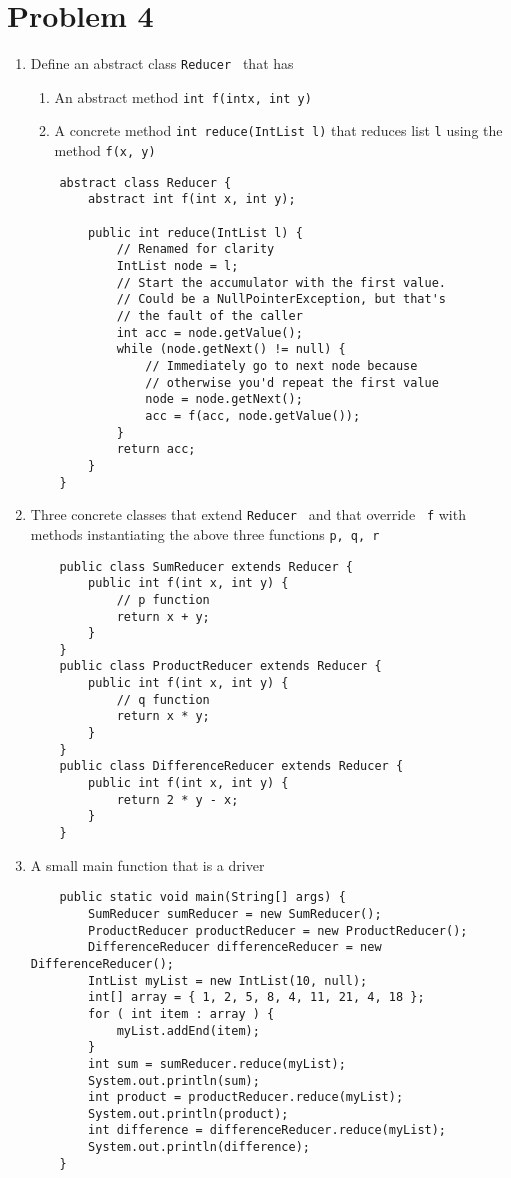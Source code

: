 \documentclass[12pt]{article}
\begin{document}
\section{Problem 4}
\begin{enumerate}
\item Define an abstract class {\tt Reducer } that has
  \begin{enumerate}[label=(\alph*)]
  \item An abstract method {\tt int f(intx, int y)}
  \item A concrete method {\tt int reduce(IntList l)} that reduces list {\tt l}
    using the method {\tt f(x, y) }
  \end{enumerate}
  \begin{verbatim}
    abstract class Reducer {
        abstract int f(int x, int y);
        
        public int reduce(IntList l) {
            // Renamed for clarity
            IntList node = l;
            // Start the accumulator with the first value.
            // Could be a NullPointerException, but that's
            // the fault of the caller
            int acc = node.getValue();
            while (node.getNext() != null) {
                // Immediately go to next node because
                // otherwise you'd repeat the first value
                node = node.getNext();
                acc = f(acc, node.getValue());
            }
            return acc;
        }
    }
  \end{verbatim}
\item Three concrete classes that extend {\tt Reducer } and that override {\tt
  f} with methods instantiating the above three functions {\tt p, q, r}
  \begin{verbatim}
    public class SumReducer extends Reducer {
        public int f(int x, int y) {
            // p function
            return x + y;
        }
    }
    public class ProductReducer extends Reducer {
        public int f(int x, int y) {
            // q function
            return x * y;
        }
    }
    public class DifferenceReducer extends Reducer {
        public int f(int x, int y) {
            return 2 * y - x;
        }
    }
  \end{verbatim}
\item A small main function that is a driver
  \begin{verbatim}
    public static void main(String[] args) {
        SumReducer sumReducer = new SumReducer();
        ProductReducer productReducer = new ProductReducer();
        DifferenceReducer differenceReducer = new DifferenceReducer();
        IntList myList = new IntList(10, null);
        int[] array = { 1, 2, 5, 8, 4, 11, 21, 4, 18 };
        for ( int item : array ) {
            myList.addEnd(item);
        }
        int sum = sumReducer.reduce(myList);
        System.out.println(sum);
        int product = productReducer.reduce(myList);
        System.out.println(product);
        int difference = differenceReducer.reduce(myList);
        System.out.println(difference);
    }
    \end{verbatim}
\end{enumerate}
\end{document}
